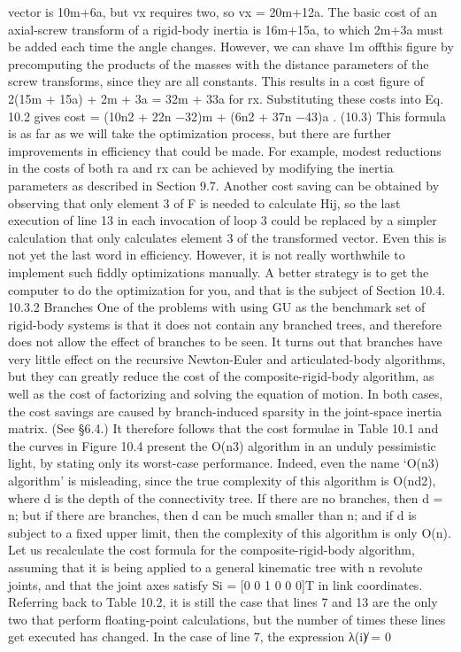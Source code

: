 vector is 10m+6a, but vx requires two, so vx = 20m+12a. The basic cost of an axial-screw transform of a rigid-body inertia is 16m+15a, to which 2m+3a must be added each time the angle changes. However, we can shave 1m offthis figure by precomputing the products of the masses with the distance parameters of the screw transforms, since they are all constants. This results in a cost figure of 2(15m + 15a) + 2m + 3a = 32m + 33a for rx. Substituting these costs into Eq. 10.2 gives cost = (10n2 + 22n −32)m + (6n2 + 37n −43)a . (10.3) This formula is as far as we will take the optimization process, but there are further improvements in efficiency that could be made. For example, modest reductions in the costs of both ra and rx can be achieved by modifying the inertia parameters as described in Section 9.7. Another cost saving can be obtained by observing that only element 3 of F is needed to calculate Hij, so the last execution of line 13 in each invocation of loop 3 could be replaced by a simpler calculation that only calculates element 3 of the transformed vector. Even this is not yet the last word in efficiency. However, it is not really worthwhile to implement such fiddly optimizations manually. A better strategy is to get the computer to do the optimization for you, and that is the subject of Section 10.4. 10.3.2 Branches One of the problems with using GU as the benchmark set of rigid-body systems is that it does not contain any branched trees, and therefore does not allow the effect of branches to be seen. It turns out that branches have very little effect on the recursive Newton-Euler and articulated-body algorithms, but they can greatly reduce the cost of the composite-rigid-body algorithm, as well as the cost of factorizing and solving the equation of motion. In both cases, the cost savings are caused by branch-induced sparsity in the joint-space inertia matrix. (See §6.4.) It therefore follows that the cost formulae in Table 10.1 and the curves in Figure 10.4 present the O(n3) algorithm in an unduly pessimistic light, by stating only its worst-case performance. Indeed, even the name ‘O(n3) algorithm’ is misleading, since the true complexity of this algorithm is O(nd2), where d is the depth of the connectivity tree. If there are no branches, then d = n; but if there are branches, then d can be much smaller than n; and if d is subject to a fixed upper limit, then the complexity of this algorithm is only O(n). Let us recalculate the cost formula for the composite-rigid-body algorithm, assuming that it is being applied to a general kinematic tree with n revolute joints, and that the joint axes satisfy Si = [0 0 1 0 0 0]T in link coordinates. Referring back to Table 10.2, it is still the case that lines 7 and 13 are the only two that perform floating-point calculations, but the number of times these lines get executed has changed. In the case of line 7, the expression λ(i)̸ = 0

